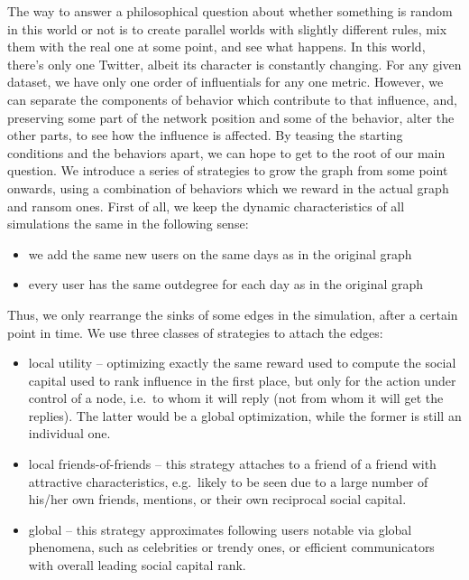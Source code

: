 \documentclass[10pt,oneside]{memoir}
\begin{document}
The way to answer a philosophical question about whether something is random in this world or not is to create parallel worlds with slightly different rules, mix them with the real one at some point, and see what happens.  In this world, there's only one Twitter, albeit its character is constantly changing.  For any given dataset, we have only one order of influentials for any one metric.  However, we can separate the components of behavior which contribute to that influence, and, preserving some part of the network position and some of the behavior, alter the other parts, to see how the influence is affected.  By teasing the starting conditions and the behaviors apart, we can hope to get to the root of our main question.
We introduce a series of strategies to grow the graph from some point onwards, using a combination of behaviors which we reward in the actual graph and ransom ones.  First of all, we keep the dynamic characteristics of all simulations the same in the following sense:


\begin{itemize}


\item we add the same new users on the same days as in the original graph

\item every user has the same outdegree for each day as in the original graph
\end{itemize}

Thus, we only rearrange the sinks of some edges in the simulation, after a certain point in time.  We use three classes of strategies to attach the edges:


\begin{itemize}


\item local utility -- optimizing exactly the same reward used to compute the social capital used to rank influence in the first place, but only for the action under control of a node, i.e.\ to whom it will reply (not from whom it will get the replies).  The latter would be a global optimization, while the former is still an individual one.

\item local friends-of-friends -- this strategy attaches to a friend of a friend with attractive characteristics, e.g.\ likely to be seen due to a large number of his/her own friends, mentions, or their own reciprocal social capital.

\item global -- this strategy approximates following users notable via global phenomena, such as celebrities or trendy ones, or efficient communicators with overall leading social capital rank.
\end{itemize}
\end{document}

